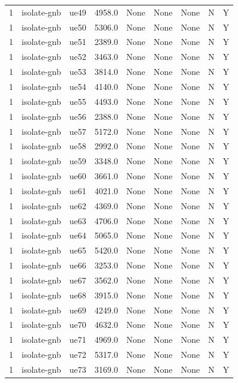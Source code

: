 \begin{table}[ht]
\begin{tabular}{|c|c|c|c|c|c|c|c|c|}
1 & isolate-gnb & ue49 & 4958.0 & None & None & None & N & Y \\
1 & isolate-gnb & ue50 & 5306.0 & None & None & None & N & Y \\
1 & isolate-gnb & ue51 & 2389.0 & None & None & None & N & Y \\
1 & isolate-gnb & ue52 & 3463.0 & None & None & None & N & Y \\
1 & isolate-gnb & ue53 & 3814.0 & None & None & None & N & Y \\
1 & isolate-gnb & ue54 & 4140.0 & None & None & None & N & Y \\
1 & isolate-gnb & ue55 & 4493.0 & None & None & None & N & Y \\
1 & isolate-gnb & ue56 & 2388.0 & None & None & None & N & Y \\
1 & isolate-gnb & ue57 & 5172.0 & None & None & None & N & Y \\
1 & isolate-gnb & ue58 & 2992.0 & None & None & None & N & Y \\
1 & isolate-gnb & ue59 & 3348.0 & None & None & None & N & Y \\
1 & isolate-gnb & ue60 & 3661.0 & None & None & None & N & Y \\
1 & isolate-gnb & ue61 & 4021.0 & None & None & None & N & Y \\
1 & isolate-gnb & ue62 & 4369.0 & None & None & None & N & Y \\
1 & isolate-gnb & ue63 & 4706.0 & None & None & None & N & Y \\
1 & isolate-gnb & ue64 & 5065.0 & None & None & None & N & Y \\
1 & isolate-gnb & ue65 & 5420.0 & None & None & None & N & Y \\
1 & isolate-gnb & ue66 & 3253.0 & None & None & None & N & Y \\
1 & isolate-gnb & ue67 & 3562.0 & None & None & None & N & Y \\
1 & isolate-gnb & ue68 & 3915.0 & None & None & None & N & Y \\
1 & isolate-gnb & ue69 & 4249.0 & None & None & None & N & Y \\
1 & isolate-gnb & ue70 & 4632.0 & None & None & None & N & Y \\
1 & isolate-gnb & ue71 & 4969.0 & None & None & None & N & Y \\
1 & isolate-gnb & ue72 & 5317.0 & None & None & None & N & Y \\
1 & isolate-gnb & ue73 & 3169.0 & None & None & None & N & Y \\

\end{tabular}
\end{table}
